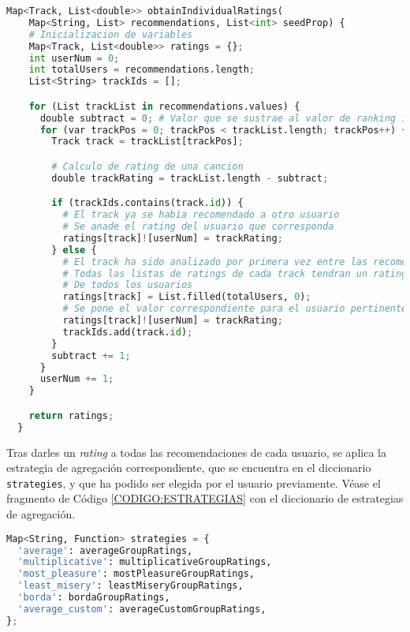\begin{lstlisting}[language=python, caption=Obtención de \textit{ratings} individuales, label=CODIGO:OBTENCION_RATINGS_INDIVIDUALES]
  Map<Track, List<double>> obtainIndividualRatings(
    Map<String, List> recommendations, List<int> seedProp) {
    # Inicializacion de variables
    Map<Track, List<double>> ratings = {};
    int userNum = 0;
    int totalUsers = recommendations.length;
    List<String> trackIds = [];

    for (List trackList in recommendations.values) {
      double subtract = 0; # Valor que se sustrae al valor de ranking invertido
      for (var trackPos = 0; trackPos < trackList.length; trackPos++) {
        Track track = trackList[trackPos];

        # Calculo de rating de una cancion
        double trackRating = trackList.length - subtract;

        if (trackIds.contains(track.id)) {
          # El track ya se habia recomendado a otro usuario
          # Se anade el rating del usuario que corresponda
          ratings[track]![userNum] = trackRating;
        } else {
          # El track ha sido analizado por primera vez entre las recomendaciones
          # Todas las listas de ratings de cada track tendran un rating de 0
          # De todos los usuarios
          ratings[track] = List.filled(totalUsers, 0);
          # Se pone el valor correspondiente para el usuario pertinente
          ratings[track]![userNum] = trackRating;
          trackIds.add(track.id);
        }
        subtract += 1;
      }
      userNum += 1;
    }

    return ratings;
  }
\end{lstlisting}

Tras darles un \textit{rating} a todas las recomendaciones de cada usuario, se aplica la estrategia de agregación correspondiente, 
que se encuentra en el diccionario \texttt{strategies}, y que ha podido ser elegida por el usuario previamente. Véase el 
fragmento de Código \ref{CODIGO:ESTRATEGIAS} con el diccionario de estrategias de agregación.

\begin{lstlisting}[language=python, caption=Diccionario de estrategias de agregación, label=CODIGO:ESTRATEGIAS]
Map<String, Function> strategies = {
  'average': averageGroupRatings,
  'multiplicative': multiplicativeGroupRatings,
  'most_pleasure': mostPleasureGroupRatings,
  'least_misery': leastMiseryGroupRatings,
  'borda': bordaGroupRatings,
  'average_custom': averageCustomGroupRatings,
};
\end{lstlisting}

